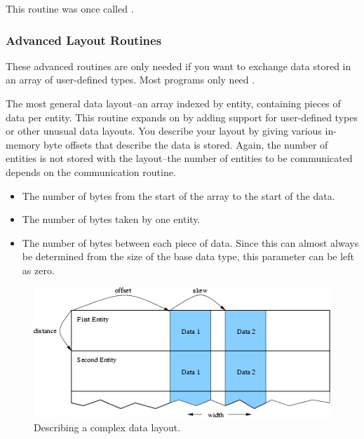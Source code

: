 This routine was once called .


\subsubsection{Advanced Layout Routines}
\label{sec:IDXLLayoutoffset}

These advanced routines are only needed if you want to exchange data stored in an array of user-defined types.  Most programs only need .


The most general data layout--an array indexed by entity, containing  pieces of data per entity.  This routine expands on  by adding support for user-defined types or other unusual data layouts.  You describe your layout by giving various in-memory byte offsets that describe the data is stored. Again, the number of entities is not stored with the layout--the number of entities to be communicated depends on the communication routine.

\begin{itemize}
  \item {} The number of bytes from the start of the array to the start of the data.
  \item {} The number of bytes taken by one entity.
  \item {} The number of bytes between each piece of data.  Since this can almost always be determined from the size of the base data type, this parameter can be left as zero.
\end{itemize}

\begin{figure}[h]
\begin{center}
\includegraphics[width=5in]{fig/layout}
\end{center}
\caption{Describing a complex data layout.}
\label{fig:layout}
\end{figure}

